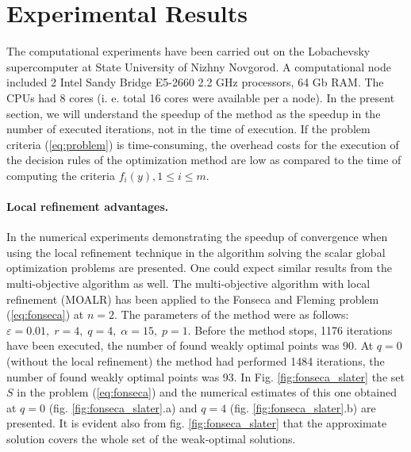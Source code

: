 \documentclass{llncs}
\begin{document}
\section{Experimental Results}
The computational experiments have been carried out on the Lobachevsky supercomputer at
State University of Nizhny Novgorod. A computational node included 2 Intel
Sandy Bridge E5-2660 2.2 GHz processors, 64 Gb RAM. The CPUs had 8 cores (i. e. total 16 cores
were available per a node).
In the present section, we will understand the speedup of the method as the speedup in the
number of executed iterations, not in the time of execution. If the problem
criteria (\ref{eq:problem}) is time-consuming, the overhead costs for the execution of the
decision rules of the optimization method are low as compared to the time of computing the
criteria \(f_i(y), 1\leqslant i\leqslant m\).

\paragraph{Local refinement advantages.} In \cite{barkalovLebedev2016} the numerical
experiments demonstrating the speedup of convergence when using the local refinement
technique in the algorithm solving the scalar global optimization problems are presented. One
could expect similar results from the multi-objective algorithm as well. The multi-objective
algorithm with local refinement (MOALR) has been applied to the  Fonseca and Fleming
problem (\ref{eq:fonseca}) at \(n=2\). The parameters of the method were as follows:
\(\varepsilon=0.01,\;r=4,\;q=4,\;\alpha=15,\;p=1\). Before the method stops, 1176 iterations
have been executed, the number of found weakly optimal points was 90. At \(q=0\) (without the
local refinement) the method had performed 1484 iterations, the number of found weakly
optimal points was 93. In Fig. \ref{fig:fonseca_slater} the set \(S\) in the problem
(\ref{eq:fonseca}) and the numerical estimates of this one obtained at \(q=0\) (fig.
\ref{fig:fonseca_slater}.a) and \(q=4\) (fig. \ref{fig:fonseca_slater}.b) are presented. It is
evident also from fig. \ref{fig:fonseca_slater} that the approximate solution covers the whole
set of the weak-optimal solutions.
\end{document}
